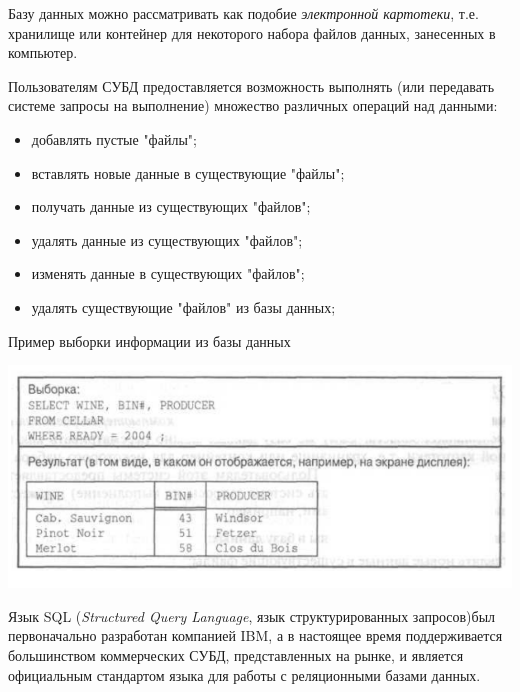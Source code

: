 \documentclass{beamer}
\begin{document}
\begin{frame}
Базу данных можно рассматривать как подобие \textit{электронной картотеки}, т.е. хранилище или контейнер для некоторого набора файлов данных, занесенных в компьютер.

Пользователям СУБД предоставляется возможность выполнять (или передавать системе запросы на выполнение) множество различных операций над данными:
\begin{itemize}
\item добавлять пустые "файлы";
\item вставлять новые данные в существующие "файлы";
\item получать данные из существующих "файлов";
\item удалять данные из существующих "файлов";
\item изменять данные в существующих "файлов";
\item удалять существующие "файлов" из базы данных;
\end{itemize}
\end{frame}

\begin{frame}
\begin{block}{Пример выборки информации из базы данных}
\begin{center}
\includegraphics[scale=0.5]{images/example-02.png}
\end{center}
\end{block}
Язык SQL (\textit{Structured Query Language}, язык структурированных запросов)был первоначально разработан компанией IBM, а в настоящее время поддерживается большинством коммерческих СУБД, представленных на рынке, и является официальным стандартом языка для работы с реляционными базами данных.
\end{frame} 
\end{document}
